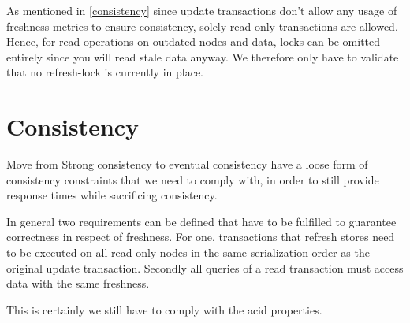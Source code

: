 As mentioned in \ref{consistency} since update transactions don't allow any usage of freshness metrics to ensure consistency, solely read-only transactions are allowed.
Hence, for read-operations on outdated nodes and data, locks can be omitted entirely since you will read stale data anyway.
We therefore only have to validate that no refresh-lock is currently in place.








\section{Consistency}
\label{sec:consistency_concept}
Move from Strong consistency to eventual consistency 
have a loose form of consistency constraints that we need to comply with, in order to still provide response times while sacrificing consistency.

In general two requirements can be defined that have to be fulfilled to
guarantee correctness in respect of freshness. For one, transactions that refresh stores need to be executed on all read-only nodes in the same serialization order as the 
original update transaction. Secondly all queries of a read transaction must access data with the same freshness. 




This is certainly we still have to comply with the acid properties. 


